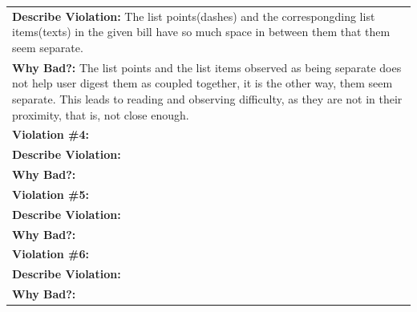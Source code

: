 \documentclass[a4paper,11pt,oneside]{scrreprt}
\begin{document}
\begin{tabularx}{\textwidth}{|X|}
		\\
		\textbf{Describe Violation:} The list points(dashes) and the correspongding list items(texts) in the given bill have so much space in between them that them seem separate.
		
		\\
		\textbf{Why Bad?:} The list points and the list items observed as being separate does not help user digest them as coupled together, it is the other way, them seem separate. This leads to reading and observing difficulty, as they are not in their proximity, that is, not close enough.
		
		\\
		\hline	
		
	\textbf{Violation \#4:} 
	
	\\
	\textbf{Describe Violation:} 
	
	\\
	\textbf{Why Bad?:} 
	
	\\
	\hline	
	
	\textbf{Violation \#5:} 
	
	\\
	\textbf{Describe Violation:} 
	
	\\
	\textbf{Why Bad?:} 
	
	\\
	\hline	
	
	\textbf{Violation \#6:} 
	
	\\
	\textbf{Describe Violation:} 
	
	\\
	\textbf{Why Bad?:} 
	
	\\
	\hline	
	
	
	
	
\end{tabularx}\\

\end{document}
